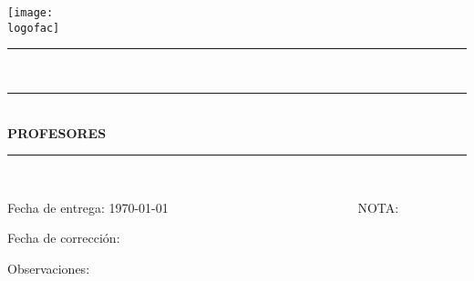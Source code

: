 
\begin{titlepage}
    \begin{center}
        \texttt{[image: \\logofac]}\\
         \vspace{-0.5cm}
        \textbf{\huge{\universidad}}
        
        \Large{\carrera}
        
         \vspace{-0.3cm}
        \LARGE{\materia}
        
        \vspace{-0.8cm}
        \rule{10cm}{0.01cm}\\
        \LARGE{\textbf{\unidad}}
        
        \vspace{-0.3cm}
        
        \Large{\titulo}
        
     \vspace{-0.3cm}
        \normalsize
        \rule{10cm}{0.01cm}\\
        \vspace{0.3cm}
        \autores
        \vspace{0.1cm}
        \textbf{PROFESORES}\\
        \profesores
        \rule{10cm}{0.01cm}\\
        
        
\end{center}
    \noindent
    \hspace{30pt}Fecha de entrega: \today ~~~~~~~~~~~~~~~~~~~~~~~~~~~~~ NOTA:
    
    \noindent
    \hspace{30pt}Fecha de corrección:
    
    \noindent
    \hspace{30pt}Observaciones: 
        
    
\end{titlepage}